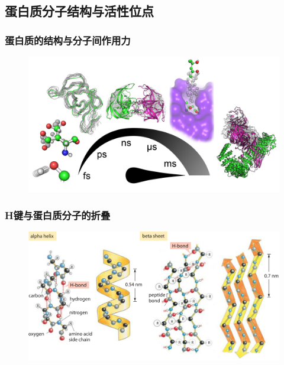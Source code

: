 \subsection{蛋白质分子结构与活性位点}
\frame
{
	\frametitle{蛋白质的结构与分子间作用力}
\begin{figure}[h!]
\centering
\vspace{-25.5pt}
\includegraphics[height=0.67\textwidth,width=1.0\textwidth,viewport=0 0 470 290,clip]{Figures/Protein-structure.png}
\label{Protein-structure-1}
\end{figure}
}

\frame
{
	\frametitle{\textrm{H}键与蛋白质分子的折叠}
\begin{figure}[h!]
\centering
\vspace{-5.5pt}
\includegraphics[height=0.57\textwidth,width=1.0\textwidth,viewport=0 0 1100 600,clip]{Figures/310-f1-AlphaBeta-1.png}
\label{Protein-structure-2}
\end{figure}
}

